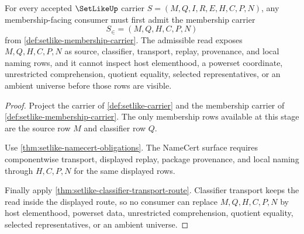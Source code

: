 \begin{theorem}
\label{thm:setlike-membership-carrier-admission}
For every accepted $\SetLikeUp$ carrier $S=(M,Q,I,R,E,H,C,P,N)$, any membership-facing consumer must first admit the membership carrier
$$
S_{\in}=(M,Q,H,C,P,N)
$$
from \autoref{def:setlike-membership-carrier}. The admissible read exposes $M,Q,H,C,P,N$ as source, classifier, transport, replay, provenance, and local naming rows, and it cannot inspect host elementhood, a powerset coordinate, unrestricted comprehension, quotient equality, selected representatives, or an ambient universe before those rows are visible.
\end{theorem}
\begin{proof}
Project the carrier of \autoref{def:setlike-carrier} and the membership carrier of \autoref{def:setlike-membership-carrier}. The only membership rows available at this stage are the source row $M$ and classifier row $Q$.

Use \autoref{thm:setlike-namecert-obligations}. The NameCert surface requires componentwise transport, displayed replay, package provenance, and local naming through $H,C,P,N$ for the same displayed rows.

Finally apply \autoref{thm:setlike-classifier-transport-route}. Classifier transport keeps the read inside the displayed route, so no consumer can replace $M,Q,H,C,P,N$ by host elementhood, powerset data, unrestricted comprehension, quotient equality, selected representatives, or an ambient universe.
\end{proof}



